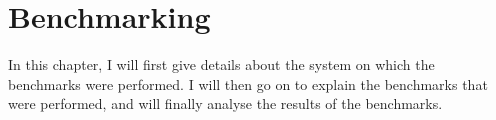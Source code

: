 \chapter{Benchmarking}
In this chapter, I will first give details about the system on which the benchmarks were performed.
I will then go on to explain the benchmarks that were performed, and will finally analyse the results of the benchmarks.






